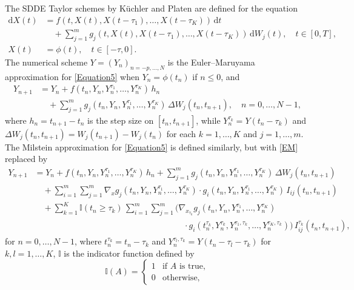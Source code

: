 \documentclass[onefignum]{siamart250211}
\begin{document}
The SDDE Taylor schemes by K\"uchler and Platen \cite{KuchlerPlaten2000} are defined for the equation
\begin{align}
\mathrm{d}X(t)&=f(t,X(t),X(t-\tau_1),\ldots,X(t-\tau_K))\,\mathrm{d}t\label{Equation5}\\
&\quad+\sum_{j=1}^mg_j(t,X(t),X(t-\tau_1),\ldots,X(t-\tau_K))\,\mathrm{d}W_j(t),\quad t\in[0,T],\nonumber\\
X(t)&=\phi(t),\quad t\in[-\tau,0].\nonumber
\end{align}
The numerical scheme $Y=(Y_n)_{n=-p,\ldots,N}$ is the Euler--Maruyama approximation for \cref{Equation5} when $Y_n=\phi(t_n)$ if $n\leqslant0$, and
\begin{align}
Y_{n+1}&=Y_n+f(t_n,Y_n,Y^{\tau_1}_n,\ldots,Y^{\tau_K}_n)\,h_n\label{EM}\\
&\quad+\sum_{j=1}^mg_j(t_n,Y_n,Y^{\tau_1}_n,\ldots,Y^{\tau_K}_n)\,\Delta W_j(t_n,t_{n+1}),\quad n=0,\ldots,N-1,\nonumber
\end{align}
where $h_n=t_{n+1}-t_n$ is the step size on $[t_n,t_{n+1}]$, while $Y^{\tau_k}_n=Y(t_n-\tau_k)$ and $\Delta W_j(t_n,t_{n+1})=W_j(t_{n+1})-W_j(t_n)$ for each $k=1,\ldots,K$ and $j=1,\ldots,m$. The Milstein approximation for \cref{Equation5} is defined similarly, but with \cref{EM} replaced by
\begin{align}Y_{n+1}&=Y_n\!+\!f(t_n,Y_n,Y^{\tau_1}_n,\ldots,Y^{\tau_K}_n)\,h_n\!+\!\sum_{j=1}^m\!g_j(t_n,Y_n,Y^{\tau_1}_n,\ldots,Y^{\tau_K}_n)\,\Delta W_j(t_n,t_{n+1})\nonumber\\
&\quad+\sum_{i=1}^m\sum_{j=1}^m\nabla_x g_j(t_n,Y_n,Y^{\tau_1}_n,\ldots,Y^{\tau_K}_n)\cdot g_i(t_n,Y_n,Y^{\tau_1}_n,\ldots,Y^{\tau_K}_n)\,I_{ij}(t_n,t_{n+1})\label{Milstein}\\
&\quad+\sum_{k=1}^K\mathbb{I}(t_n\geqslant\tau_k)\,\sum_{i=1}^m\sum_{j=1}^m\bigg(\nabla_{x_{\tau_k}} g_j(t_n,Y_n,Y^{\tau_1}_n,\ldots,Y^{\tau_K}_n) \nonumber\\
&\phantom{\quad+\sum_{k=1}^K\mathbb{I}(t_n\geqslant\tau_k)\,\sum_{i=1}^m\sum_{j=1}^m}\quad \cdot g_i(t_n^{\tau_k},Y^{\tau_k}_n,Y^{\tau_1,\tau_k}_n,\ldots,Y^{\tau_K,\tau_k}_n)\bigg)\,I_{ij}^{\tau_k}(t_n,t_{n+1}),\nonumber\end{align}
for $n=0,\ldots,N-1$, where $t_n^{\tau_k}=t_n-\tau_k$ and $Y_n^{\tau_l,\tau_k}=Y(t_n-\tau_l-\tau_k)$ for $k,l=1,\ldots,K$, $\mathbb{I}$ is the indicator function defined by
\[\mathbb{I}(A)=\begin{cases}1&\textrm{if }A\textrm{ is true},\\ 0&\textrm{otherwise},\end{cases}\]
\end{document}
